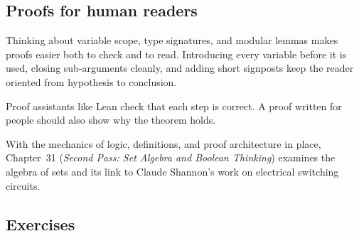 \subsection{Proofs for human readers}

Thinking about variable scope, type signatures, and modular lemmas makes proofs easier both to check and to read. Introducing every variable before it is used, closing sub-arguments cleanly, and adding short signposts keep the reader oriented from hypothesis to conclusion.

Proof assistants like Lean check that each step is correct. A proof written for people should also show why the theorem holds.

With the mechanics of logic, definitions, and proof architecture in place, Chapter~31 (\emph{Second Pass: Set Algebra and Boolean Thinking}) examines the algebra of sets and its link to Claude Shannon's work on electrical switching circuits.

\subsection{Exercises}

